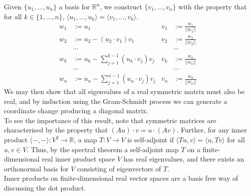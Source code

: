 \documentclass{tikzposter} %
\begin{document}
\begin{columns}
{  Given $\{u_{1}, \hdots, u_{n}\}$ a basis for $\mathbb{R}^{n}$, we construct $\{v_{1},\hdots,v_{n}\}$ with the property that for all $k \in \{1,\hdots,n\}$, $\langle u_{1},\hdots,u_{k}\rangle = \langle v_{1},\hdots,v_{k}\rangle$.
  \begin{align*}
    w_{1} &:= u_{1} & v_{1} &:= \frac{w_{1}}{||w_{1}||} \\
    w_{2} &:= u_{2} - (u_{2} \cdot v_{1}) v_{1} & v_{2} &:= \frac{w_{2}}{||w_{2}||} \\
          &\cdots & &\cdots \\
    w_{k} &:= u_{k} - \sum_{j=1}^{k-1} (u_{k} \cdot v_{j})v_{j} & v_{k} &:= \frac{w_{k}}{||w_{k}||} \\
          &\cdots & &\cdots \\
    w_{n} &:= u_{n} - \sum_{j=1}^{n-1} (u_{n} \cdot v_{j}) v_{j} & v_{n} &:= \frac{w_{n}}{||w_{n}||}
  \end{align*}
  We may then show that all eigenvalues of a real symmetric matrix must also be real, and by induction using the Gram-Schmidt process we can generate a coordinate change producing a diagonal matrix. \\

  To see the importance of this result, note that symmetric matrices are characterised by the property that $(Au) \cdot v = u \cdot (Av)$. Further, for any inner product $\langle -, - \rangle : V^{2} \to \mathbb{R}$, a map $T : V \to V$ is self-adjoint if $\langle Tu, v \rangle = \langle u, Tv \rangle$ for all $u, v \in V$. Thus, by the spectral theorem a self-adjoint map $T$ on a finite-dimensional real inner product space $V$ has real eigenvalues, and there exists an orthonormal basis for $V$ consisting of eigenvectors of $T$. \\

  Inner products on finite-dimensional real vector spaces are a basis free way of discussing the dot product.\\

  }
\end{columns}
\end{document}
